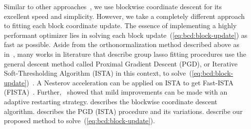 Similar to other approaches~\citep{yuan:2006,meier:2008,tseng:2001,sparsegl:2022},
we use blockwise coordinate descent for its excellent speed and simplicity.
However, we take a completely different approach to fitting each block coordinate update.
The essence of implementing a highly performant optimizer lies in 
solving each block update~(\ref{eq:bcd:block-update}) as fast as possible.
Aside from the orthonormalization method described above as in~\citet{yuan:2006,meier:2008},
many works in literature that describe group lasso fitting procedures
use the general descent method called Proximal Gradient Descent (PGD), 
or Iterative Soft-Thresholding Algorithm (ISTA) in this context,
to solve~(\ref{eq:bcd:block-update})~\citep{sparsegl:2022,beck:2009,klosa:2020,wright:2009,loris:2009,sls:2016,odonoghue:2015}.
A Nesterov acceleration can be applied on ISTA to get Fast-ISTA (FISTA)~\citep{beck:2009}.
Further,~\citet{odonoghue:2015} showed that mild improvements can be made with an adaptive restarting strategy.
 describes the blockwise coordinate descent algorithm.
 describes the PGD (ISTA) procedure and its variations.
 describe our proposed method to solve~(\ref{eq:bcd:block-update}).




